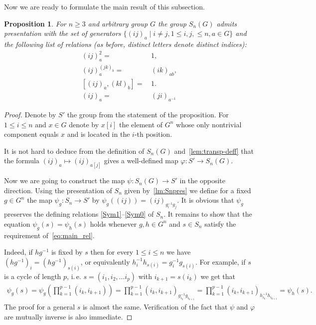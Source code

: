 \documentclass[oneside, 12pt]{amsart}
\theoremstyle{plain}
\numberwithin{equation}{section}
\numberwithin{lemma}{section}
\newtheorem{prop}[lemma]{Proposition}
\theoremstyle{remark}
\theoremstyle{definition}
\begin{document}
Now we are ready to formulate the main result of this subsection.
\begin{prop} \label{prop:Q-pres} For $n\geq 3$ and arbitrary group $G$ the group $S_n(G)$ admits presentation with the set of generators 
$\{(ij)_a \mid i\neq j, 1\leq i,j,\leq n, a\in G\}$ and the following list of relations (as before, distinct letters denote distinct indices):
\begin{align}
(ij)_a^2 = &\, 1,                \label{Q1} \tag{SG1} \\
(ij)_a^{(jk)_b} = &\, (ik)_{ab}, \label{Q2} \tag{SG2} \\
[(ij)_a, (kl)_b] = &\,1.         \label{Q3} \tag{SG3} \\
(ij)_a =&\, (ji)_{a^{-1}}        \label{Q4} \tag{SG4} 
\end{align}
\end{prop}
\begin{proof}
Denote by $S'$ the group from the statement of the proposition.
For $1\leq i\leq n$ and $x\in G$ denote by $x[i]$ the element of $G^n$ 
 whose only nontrivial component equals $x$ and is located in the $i$-th position.

It is not hard to deduce from the definition of $S_n(G)$ and~\cref{lem:transp-deff} 
 that the formula $(ij)_a \mapsto (ij)_{a[j]}$ gives a well-defined map $\varphi\colon S'\to S_n(G)$.

Now we are going to construct the map $\psi\colon S_n(G)\to S'$ in the opposite direction. 
Using the presentation of $S_n$ given by~\cref{lm:Snpres}  we define for a fixed $g\in G^n$ the map 
 $\psi_g\colon S_n \to S'$ by $\psi_g((ij)) = (ij)_{g_i^{-1} g_j}.$
It is obvious that $\psi_g$ preserves the defining relations \eqref{Sym1}--\eqref{Sym0} of $S_n$. 
It remains to show that the equation $\psi_g(s) = \psi_h(s)$ holds whenever $g, h\in G^n$ and $s\in S_n$ satisfy the requirement of~\eqref{eq:main_rel}.

Indeed, if $hg^{-1}$ is fixed by $s$ then for every $1\leq i\leq n$ we have $(hg^{-1})_i = (hg^{-1})_{s(i)}$, or equivalently
$h_i^{-1} h_{s(i)} = g_i^{-1} g_{s(i)}$. %
For example, if $s$ is a cycle of length $p$, i.\,e. $s=(i_1, i_2, \ldots i_p)$ with $i_{k+1} = s(i_k)$ we get that
\begin{multline} \nonumber
 \psi_g(s) = \psi_g\left({\prod\limits_{k=1}^{p-1}(i_k, i_{k+1})}\right) = 
 \prod\limits_{k=1}^{p-1}\left(i_k, i_{k+1}\right)_{g_{i_k}^{-1} g_{i_{k+1}}} = 
 \prod\limits_{k=1}^{p-1}\left(i_k, i_{k+1}\right)_{h_{i_k}^{-1} h_{i_{k+1}}} = \psi_h(s).
\end{multline}
The proof for a general $s$ is almost the same.
Verification of the fact that $\psi$ and $\varphi$ are mutually inverse is also immediate.
\end{proof}
\end{document}
